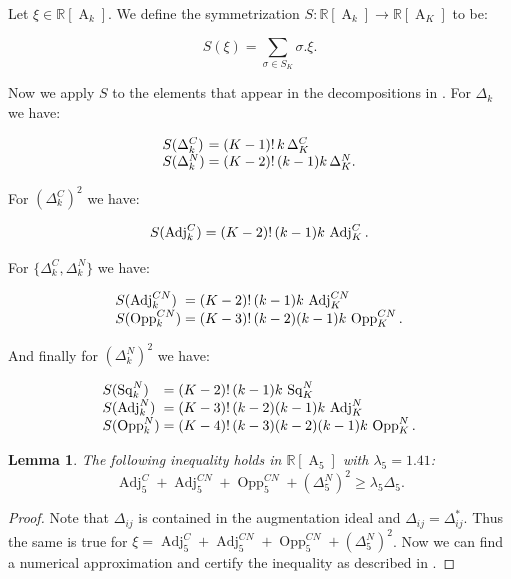 \documentclass[12pt]{amsart}
\newtheorem{lemma}[theorem]{Lemma}
\theoremstyle{definition}
\numberwithin{figure}{section}
\numberwithin{table}{section}
\numberwithin{equation}{section}
\newcommand{\A}{\operatorname{A}}
\newcommand{\Adj}{\operatorname{Adj}}
\newcommand{\Sq}{\operatorname{Sq}}
\newcommand{\Opp}{\operatorname{Opp}}
\newcommand{\BB}[1]{{\mathbb #1}}
\begin{document}
Let $\xi \in \BB R[\A_k]$. We define the symmetrization $S \colon \BB R[\A_k] \to \BB R[\A_K]$ to be:

$$
S(\xi) = \sum_{\sigma \in S_K} \sigma.\xi.
$$

Now we apply $S$ to the elements that appear in the decompositions in  . For $\Delta_k$ we have:

\[
\begin{array}{l@{\;}c@{\;}l@{\;\;}l}
S(\Delta_k^C)   & = & (K-1)!\,k\,\Delta_K^C\\
S(\Delta_k^N)   & = & (K-2)!\,(k-1)k\,\Delta_K^N.
\end{array}
\]

For $(\Delta_k^C)^2$ we have:

\[
\begin{array}{l@{\;}c@{\;}l@{\;\;}l}
S(\Adj_k^C)     & = & (K-2)!\,(k-1)k\,\Adj_K^C.
\end{array}
\]

For $\{\Delta_k^C,\Delta_k^N\}$ we have:

\[
\begin{array}{l@{\;}c@{\;}l@{\;\;}l}
S(\Adj_k^{CN})  & = & (K-2)!\,(k-1)k\,\Adj_K^{CN}\\
S(\Opp_k^{CN})  & = & (K-3)!\,(k-2)(k-1)k\,\Opp_K^{CN}.
\end{array}
\]

And finally for $(\Delta_k^N)^2$ we have:

\[
\begin{array}{l@{\;}c@{\;}l@{\;\;}l}
S(\Sq_k^N)      & = & (K-2)!\,(k-1)k\,\Sq_K^N\\
S(\Adj_k^N)     & = & (K-3)!\,(k-2)(k-1)k\,\Adj_K^N\\
S(\Opp_k^N)     & = & (K-4)!\,(k-3)(k-2)(k-1)k\,\Opp_K^N.
\end{array}
\]

\begin{lemma}\label{l:induction-element}
The following inequality holds in $\BB R[\A_5]$ with $\lambda_5 = 1.41$:
$$\Adj_5^C + \Adj_5^{CN} + \Opp_5^{CN} + (\Delta_5^N)^2 \geq \lambda_5\Delta_5.$$
\end{lemma}

\begin{proof}
Note that $\Delta_{ij}$ is contained in the augmentation ideal and $\Delta_{ij} = \Delta_{ij}^*$. Thus the same is true for $\xi = \Adj_5^C + \Adj_5^{CN} + \Opp_5^{CN} + (\Delta_5^N)^2$. Now we can find a numerical approximation and certify the inequality as described in .
\end{proof}
\end{document}
